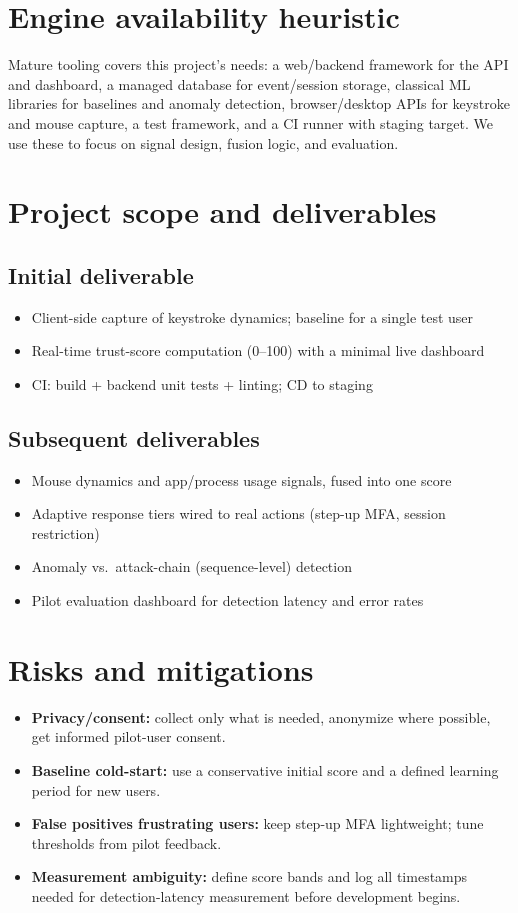 \documentclass[11pt,a4paper]{article}
\begin{document}
\section{Engine availability heuristic}
Mature tooling covers this project's needs: a web/backend framework
for the API and dashboard, a managed database for event/session
storage, classical ML libraries for baselines and anomaly detection,
browser/desktop APIs for keystroke and mouse capture, a test
framework, and a CI runner with staging target. We use these to focus
on signal design, fusion logic, and evaluation.

\section{Project scope and deliverables }
\subsection{Initial deliverable}
\begin{itemize}
    \item Client-side capture of keystroke dynamics; baseline for a single test user
    \item Real-time trust-score computation (0--100) with a minimal live dashboard
    \item CI: build + backend unit tests + linting; CD to staging
\end{itemize}

\subsection{Subsequent deliverables}
\begin{itemize}
    \item Mouse dynamics and app/process usage signals, fused into one score
    \item Adaptive response tiers wired to real actions (step-up MFA, session restriction)
    \item Anomaly vs.\ attack-chain (sequence-level) detection
    \item Pilot evaluation dashboard for detection latency and error rates
\end{itemize}

\section{Risks and mitigations}
\begin{itemize}
    \item \textbf{Privacy/consent:} collect only what is needed, anonymize where possible, get informed pilot-user consent.
    \item \textbf{Baseline cold-start:} use a conservative initial score and a defined learning period for new users.
    \item \textbf{False positives frustrating users:} keep step-up MFA lightweight; tune thresholds from pilot feedback.
    \item \textbf{Measurement ambiguity:} define score bands and log all timestamps needed for detection-latency measurement before development begins.
\end{itemize}
\end{document}

